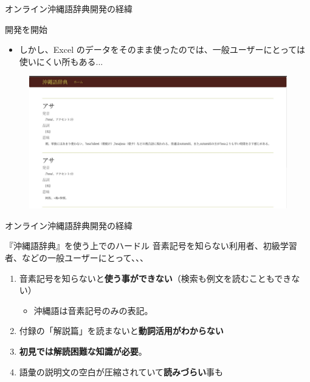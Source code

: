 \documentclass[14pt]{beamer}
\begin{document}
\begin{frame}{オンライン沖縄語辞典開発の経緯}
  \begin{block}{開発を開始}
    \begin{itemize}
    \item しかし、Excel のデータをそのまま使ったのでは、一般ユーザーにとっては使いにくい所もある...
    \end{itemize}
  \end{block}
  \begin{figure}[ht]
    \centering
    \includegraphics[height=0.36\paperheight]{okinawago-app-early-page.jpeg}
  \end{figure}
\end{frame}

\begin{frame}{オンライン沖縄語辞典開発の経緯}
  \begin{block}{『沖縄語辞典』を使う上でのハードル}
    \vspace{0pt}
    音素記号を知らない利用者、初級学習者、などの一般ユーザーにとって、、、
    \begin{enumerate}
    \item 音素記号を知らないと\textbf{使う事ができない}（検索も例文を読むこともできない）
      \begin{itemize}
      \item 沖縄語は音素記号のみの表記。
      \end{itemize}
    \item 付録の「解説篇」を読まないと\textbf{動詞活用がわからない}
    \item \textbf{初見では解読困難な知識が必要}。
    \item 語彙の説明文の空白が圧縮されていて\textbf{読みづらい}事も
    \end{enumerate}
  \end{block}
\end{frame}
\end{document}

